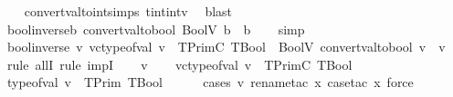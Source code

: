 \begin{isabellebody}
%
\isadelimproof
\ \ %
\endisadelimproof
%
\isatagproof
{}\isamarkupfalse%
\ convert{\isacharunderscore}{\kern0pt}val{\isacharunderscore}{\kern0pt}to{\isacharunderscore}{\kern0pt}int{\isachardot}{\kern0pt}simps{\isacharparenleft}{\kern0pt}{}{\isacharparenright}{\kern0pt}\ tint{\isacharunderscore}{\kern0pt}intv\ \isamarkupfalse%
\ blast%
\endisatagproof
{\isafoldproof}%
%
\isadelimproof
\isanewline
%
\endisadelimproof
\isanewline
{}\isamarkupfalse%
\ bool{\isacharunderscore}{\kern0pt}inverse{\isacharunderscore}{\kern0pt}{}{\isacharcolon}{\kern0pt}{\isachardoublequoteopen}{\isasymforall}b{\isachardot}{\kern0pt}\ convert{\isacharunderscore}{\kern0pt}val{\isacharunderscore}{\kern0pt}to{\isacharunderscore}{\kern0pt}bool\ {\isacharparenleft}{\kern0pt}BoolV\ b{\isacharparenright}{\kern0pt}\ {\isacharequal}{\kern0pt}\ b{\isachardoublequoteclose}\isanewline
%
\isadelimproof
\ \ %
\endisadelimproof
%
\isatagproof
{}\isamarkupfalse%
\ simp%
\endisatagproof
{\isafoldproof}%
%
\isadelimproof
\isanewline
%
\endisadelimproof
\isanewline
{}\isamarkupfalse%
\ bool{\isacharunderscore}{\kern0pt}inverse{\isacharunderscore}{\kern0pt}{}{\isacharcolon}{\kern0pt}{\isachardoublequoteopen}{\isasymforall}\ v{\isachardot}{\kern0pt}\ vc{\isacharunderscore}{\kern0pt}type{\isacharunderscore}{\kern0pt}of{\isacharunderscore}{\kern0pt}val\ v\ {\isacharequal}{\kern0pt}\ TPrimC\ TBool\ {\isasymlongrightarrow}\ BoolV\ {\isacharparenleft}{\kern0pt}convert{\isacharunderscore}{\kern0pt}val{\isacharunderscore}{\kern0pt}to{\isacharunderscore}{\kern0pt}bool\ v{\isacharparenright}{\kern0pt}\ {\isacharequal}{\kern0pt}\ v{\isachardoublequoteclose}\isanewline
%
\isadelimproof
%
\endisadelimproof
%
\isatagproof
{}\isamarkupfalse%
\ {\isacharparenleft}{\kern0pt}rule\ allI{\isacharcomma}{\kern0pt}\ rule\ impI{\isacharparenright}{\kern0pt}\isanewline
\ \ \isamarkupfalse%
\ v\isanewline
\ \ \isamarkupfalse%
\ {\isachardoublequoteopen}vc{\isacharunderscore}{\kern0pt}type{\isacharunderscore}{\kern0pt}of{\isacharunderscore}{\kern0pt}val\ v\ {\isacharequal}{\kern0pt}\ TPrimC\ TBool{\isachardoublequoteclose}\isanewline
\ \ \isamarkupfalse%
\ {\isachardoublequoteopen}type{\isacharunderscore}{\kern0pt}of{\isacharunderscore}{\kern0pt}val\ v\ {\isacharequal}{\kern0pt}\ TPrim\ TBool{\isachardoublequoteclose}\isanewline
\ \ \ \ \isamarkupfalse%
\ {\isacharparenleft}{\kern0pt}cases\ v{\isacharcomma}{\kern0pt}\ rename{\isacharunderscore}{\kern0pt}tac\ x{\isacharcomma}{\kern0pt}\ case{\isacharunderscore}{\kern0pt}tac\ x{\isacharsemicolon}{\kern0pt}\ force{\isacharparenright}{\kern0pt}\isanewline

\end{isabellebody}

